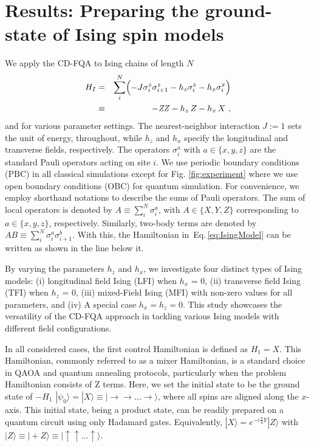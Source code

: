 \documentclass[twocolumn,aps,superscriptaddress,floatfix,longbibliography]{revtex4-2}
\newcommand{\Eq}[1]{Eq.\,\eqref{#1}}
\def\ZZ{\ensuremath{\mathit{ZZ}}\xspace}
\begin{document}
\section{Results: Preparing the ground-state of Ising spin models}
\label{sec:results:Ising}

We apply the CD-FQA to Ising chains
of length $N$  %
\begin{eqnarray}
   H_{I} %
   &=& \sum_{i}^N \Bigl(
        -J \sigma_{i}^z\sigma_{i+1}^z
     - h_z \sigma_{i}^z
     - h_x \sigma_{i}^x
   \Bigr)
\label{eq:IsingModel} \\
  &\equiv& - \ZZ - h_z \, Z - h_x \, X
\text{ ,}\notag
\end{eqnarray}
and for various parameter settings.
The nearest-neighbor interaction $J:=1$ 
sets the unit of energy, throughout,
while $h_z$ and $h_x$ specify %
 the longitudinal and transverse fields, respectively. The operators
$\sigma_{i}^a$ with $a \in \{x,y,z\}$ are the standard Pauli
operators acting on site $i$.
We use periodic boundary
conditions (PBC) in all classical simulations except for Fig. \ref{fig:experiment}
where we use open boundary conditions  (OBC) for quantum simulation.  
%
For convenience, we employ shorthand notations to describe the
sums of Pauli operators. The sum of local operators
is denoted by $A \equiv \sum_{i}^N \sigma_{i}^a$,
with $A \in \{X,Y,Z\}$ corresponding to $a\in \{x,y,z\}$, respectively.
Similarly, two-body terms are denoted by
$AB \equiv \sum_{i}^N \sigma_{i}^a\sigma_{i+1}^b$.
With this, the Hamiltonian in~\Eq{eq:IsingModel}
can be written as shown in the line below it.

By varying the parameters
$h_z$ and $h_x$,
we investigate four distinct types of Ising models:
(i)   longitudinal field Ising (LFI) when $h_x$ = 0,
(ii)  transverse field Ising (TFI) when $h_z$ = 0,
(iii) mixed-Field Ising (MFI) with non-zero values for all %
parameters, and
(iv)  A special case $h_x=h_z=0$. %
This study showcases the versatility of the CD-FQA approach in
tackling various Ising models with different field
configurations. 

In all considered cases, the first control Hamiltonian is
defined as $H_1=X$. This Hamiltonian, commonly referred to as a
mixer Hamiltonian, is a standard choice in QAOA and quantum
annealing protocols, particularly when the problem Hamiltonian
consists of Z %
terms. Here, we set the initial state
to be the ground state of $-H_1$ %
$|\psi_{0}\rangle = |X\rangle \equiv
|\rightarrow\rightarrow \ldots \rightarrow\rangle$,
where all spins
are aligned along the $x$-axis. This initial state, being a
product state, can be readily prepared on a quantum circuit
using only Hadamard gates. Equivalently,
$|X\rangle = e^{-i\frac{\pi}{4} Y} |Z\rangle$
with $|Z\rangle \equiv |{+}Z\rangle
\equiv |\uparrow \uparrow \ldots \uparrow \rangle$.
\end{document}
